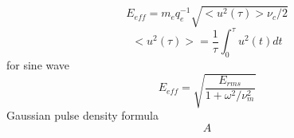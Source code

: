 \documentclass[a4paper,10pt]{article}
\begin{document}
\begin{equation}
E_{eff} = m_{e} q_{e}^{-1} \sqrt{ < u^{2}(\tau) > \nu_{c} /2 }
\end{equation}
\begin{equation}
<u^{2}(\tau)>=\frac{1}{\tau}\int^{\tau}_{0}u^{2}(t)d t
\end{equation}
for sine wave
\begin{equation}
E_{eff}=\sqrt{\frac{E_{rms}}{1+\omega^{2}/\nu^{2}_{m}}}
\end{equation}
Gaussian pulse density formula
\begin{equation}
A
\end{equation}
\end{document}
